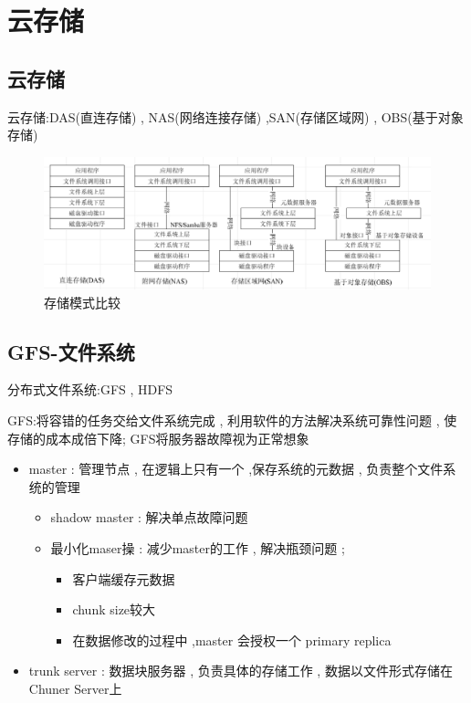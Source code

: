 \documentclass[UTF8,a4paper]{ctexart}
\begin{document}
\section{云存储}
\subsection{云存储}

云存储:DAS(直连存储) , NAS(网络连接存储) ,SAN(存储区域网) , OBS(基于对象存储)
\begin{figure}[H]
  \centering
  \includegraphics[scale = 0.3]{assets/ParallelComputing_85add.png}
  \caption{存储模式比较}
\end{figure}

\subsection{GFS-文件系统}

分布式文件系统:GFS , HDFS

GFS:将容错的任务交给文件系统完成 , 利用软件的方法解决系统可靠性问题 , 使存储的成本成倍下降; GFS将服务器故障视为正常想象

\begin{itemize}
  \item master : 管理节点 , 在逻辑上只有一个 ,保存系统的元数据 , 负责整个文件系统的管理
  \begin{itemize}
    \item shadow master : 解决单点故障问题
    \item 最小化maser操 : 减少master的工作 , 解决瓶颈问题 ;
    \begin{itemize}
      \item 客户端缓存元数据
      \item chunk size较大
      \item 在数据修改的过程中 ,master 会授权一个 primary replica
    \end{itemize}
  \end{itemize}
  \item trunk server : 数据块服务器 , 负责具体的存储工作 , 数据以文件形式存储在Chuner Server上
\end{itemize}
\end{document}
